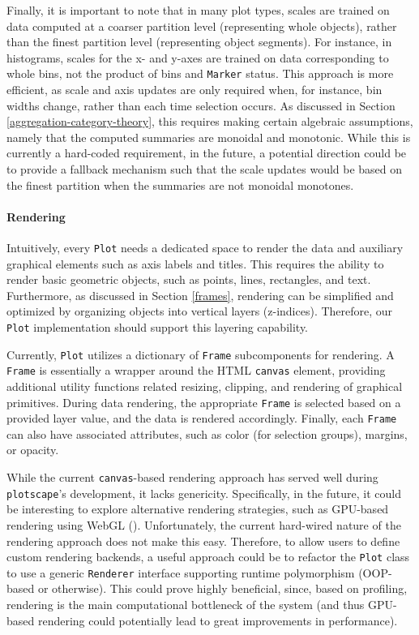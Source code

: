 \documentclass[
  openany]{book}
\theoremstyle{definition}
\theoremstyle{definition}
\theoremstyle{definition}
\theoremstyle{definition}
\theoremstyle{remark}
\begin{document}
Finally, it is important to note that in many plot types, scales are trained on data computed at a coarser partition level (representing whole objects), rather than the finest partition level (representing object segments). For instance, in histograms, scales for the x- and y-axes are trained on data corresponding to whole bins, not the product of bins and \texttt{Marker} status. This approach is more efficient, as scale and axis updates are only required when, for instance, bin widths change, rather than each time selection occurs. As discussed in Section \ref{aggregation-category-theory}, this requires making certain algebraic assumptions, namely that the computed summaries are monoidal and monotonic. While this is currently a hard-coded requirement, in the future, a potential direction could be to provide a fallback mechanism such that the scale updates would be based on the finest partition when the summaries are not monoidal monotones.

\paragraph{Rendering}\label{plot-rendering}

Intuitively, every \texttt{Plot} needs a dedicated space to render the data and auxiliary graphical elements such as axis labels and titles. This requires the ability to render basic geometric objects, such as points, lines, rectangles, and text. Furthermore, as discussed in Section \ref{frames}, rendering can be simplified and optimized by organizing objects into vertical layers (z-indices). Therefore, our \texttt{Plot} implementation should support this layering capability.

Currently, \texttt{Plot} utilizes a dictionary of \texttt{Frame} subcomponents for rendering. A \texttt{Frame} is essentially a wrapper around the HTML \texttt{canvas} element, providing additional utility functions related resizing, clipping, and rendering of graphical primitives. During data rendering, the appropriate \texttt{Frame} is selected based on a provided layer value, and the data is rendered accordingly. Finally, each \texttt{Frame} can also have associated attributes, such as color (for selection groups), margins, or opacity.

While the current \texttt{canvas}-based rendering approach has served well during \texttt{plotscape}'s development, it lacks genericity. Specifically, in the future, it could be interesting to explore alternative rendering strategies, such as GPU-based rendering using WebGL (). Unfortunately, the current hard-wired nature of the rendering approach does not make this easy. Therefore, to allow users to define custom rendering backends, a useful approach could be to refactor the \texttt{Plot} class to use a generic \texttt{Renderer} interface supporting runtime polymorphism (OOP-based or otherwise). This could prove highly beneficial, since, based on profiling, rendering is the main computational bottleneck of the system (and thus GPU-based rendering could potentially lead to great improvements in performance).
\end{document}
